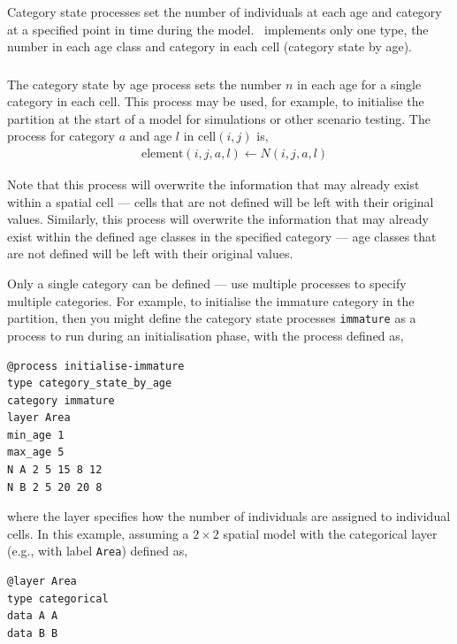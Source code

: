 Category state processes set the number of individuals at each age and category at a specified point in time during the model. \SPM\ implements only one type, the number in each age class and category in each cell (category state by age).

\subsubsection*{}

The category state by age process sets the number $n$ in each age for a single category in each cell. This process may be used, for example, to initialise the partition at the start of a model for simulations or other scenario testing. The process for category $a$ and age $l$ in cell$(i,j)$ is,
\begin{equation}\begin{split}
  & \text{element}(i,j,a,l) \leftarrow N(i,j,a,l)
\end{split}\end{equation}

Note that this process will overwrite the information that may already exist within a spatial cell --- cells that are not defined will be left with their original values. Similarly, this process will overwrite the information that may already exist within the defined age classes in the specified category --- age classes that are not defined will be left with their original values. 

Only a single category can be defined --- use multiple processes to specify multiple categories. For example, to initialise the immature category in the partition, then you might define the category state processes \texttt{immature} as a process to run during an initialisation phase, with the process defined as,
{\small{\begin{verbatim}
@process initialise-immature
type category_state_by_age
category immature
layer Area
min_age 1
max_age 5
N A 2 5 15 8 12
N B 2 5 20 20 8
\end{verbatim}}}

where the layer specifies how the number of individuals are assigned to individual cells. In this example, assuming a $2 \times 2$ spatial model with the categorical layer (e.g., with label \texttt{Area}) defined as,
{\small{\begin{verbatim}
@layer Area
type categorical
data A A 
data B B
\end{verbatim}}}

